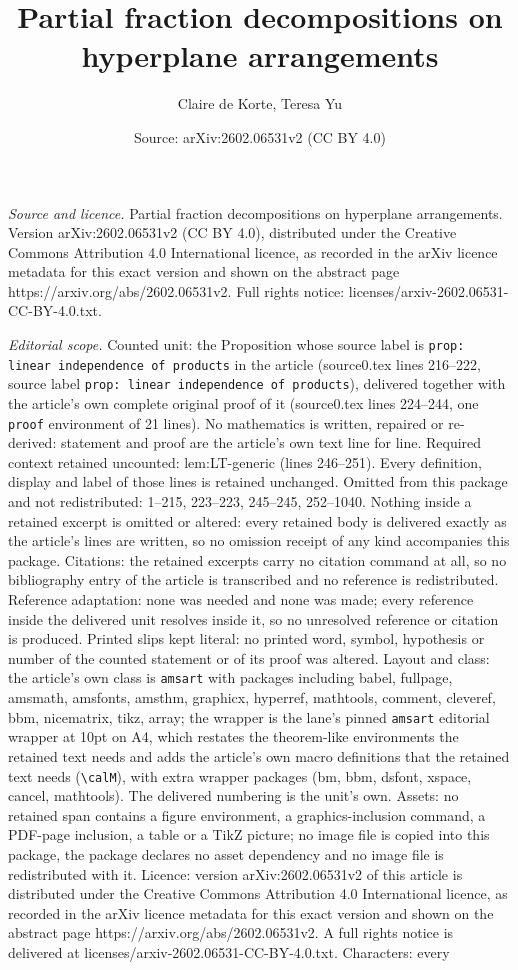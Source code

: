 \documentclass[10pt,a4paper]{amsart}
\title[Partial fraction decompositions on hyperplane arrangements]{Partial fraction decompositions on hyperplane arrangements}
\author{Claire de Korte, Teresa Yu}
\date{Source: arXiv:2602.06531v2 (CC BY 4.0)}
\begin{document}
\maketitle

\noindent\emph{Source and licence.} Partial fraction decompositions on hyperplane arrangements. Version arXiv:2602.06531v2 (CC BY 4.0), distributed under the Creative Commons Attribution 4.0 International licence, as recorded in the arXiv licence metadata for this exact version and shown on the abstract page https://arxiv.org/abs/2602.06531v2. Full rights notice: licenses/arxiv-2602.06531-CC-BY-4.0.txt.\par\smallskip

\noindent\textit{Editorial scope.} Counted unit: the Proposition whose source label is \texttt{prop: linear independence of products} in the article (source0.tex lines 216--222, source label \texttt{prop: linear independence of products}), delivered together with the article's own complete original proof of it (source0.tex lines 224--244, one \texttt{proof} environment of 21 lines). No mathematics is written, repaired or re-derived: statement and proof are the article's own text line for line. Required context retained uncounted: lem:LT-generic (lines 246--251). Every definition, display and label of those lines is retained unchanged. Omitted from this package and not redistributed: 1--215, 223--223, 245--245, 252--1040. Nothing inside a retained excerpt is omitted or altered: every retained body is delivered exactly as the article's lines are written, so no omission receipt of any kind accompanies this package. Citations: the retained excerpts carry no citation command at all, so no bibliography entry of the article is transcribed and no reference is redistributed. Reference adaptation: none was needed and none was made; every reference inside the delivered unit resolves inside it, so no unresolved reference or citation is produced. Printed slips kept literal: no printed word, symbol, hypothesis or number of the counted statement or of its proof was altered. Layout and class: the article's own class is \texttt{amsart} with packages including babel, fullpage, amsmath, amsfonts, amsthm, graphicx, hyperref, mathtools, comment, cleveref, bbm, nicematrix, tikz, array; the wrapper is the lane's pinned \texttt{amsart} editorial wrapper at 10pt on A4, which restates the theorem-like environments the retained text needs and adds the article's own macro definitions that the retained text needs (\texttt{\textbackslash calM}), with extra wrapper packages (bm, bbm, dsfont, xspace, cancel, mathtools). The delivered numbering is the unit's own. Assets: no retained span contains a figure environment, a graphics-inclusion command, a PDF-page inclusion, a table or a TikZ picture; no image file is copied into this package, the package declares no asset dependency and no image file is redistributed with it. Licence: version arXiv:2602.06531v2 of this article is distributed under the Creative Commons Attribution 4.0 International licence, as recorded in the arXiv licence metadata for this exact version and shown on the abstract page https://arxiv.org/abs/2602.06531v2. A full rights notice is delivered at licenses/arxiv-2602.06531-CC-BY-4.0.txt. Characters: every 
\end{document}
